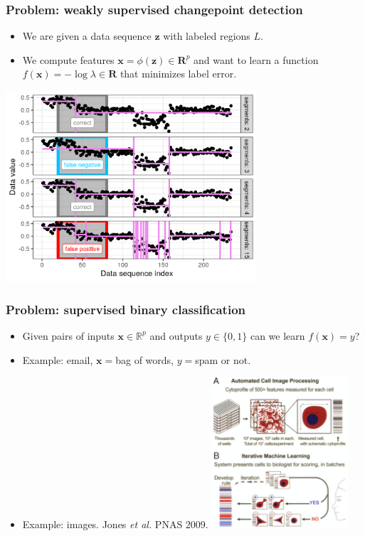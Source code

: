 \documentclass{beamer}
\begin{document}
\begin{frame}
  \frametitle{Problem: weakly supervised changepoint detection}
  \begin{itemize}
  \item We are given a data sequence $\mathbf z$ with labeled regions
    $L$.
  \item We compute features $\mathbf x=\phi(\mathbf z)\in\mathbf R^p$
    and want to learn a function $f(\mathbf x)=-\log\lambda\in\mathbf R$ that minimizes label
    error.
  \end{itemize}

  \includegraphics[width=0.7\textwidth]{figure-fn-not-monotonic}

\end{frame}

\begin{frame}
  \frametitle{Problem: supervised binary classification}
  
  \begin{itemize}
  \item Given pairs of inputs $\mathbf x\in\mathbb R^p$ and outputs
    $y\in\{0,1\}$ can we learn $f(\mathbf x)= y$?
  \item Example: email, $\mathbf x =$bag of words, $y=$spam or not.
  \item Example: images. Jones {\it et al.} PNAS 2009. \includegraphics[width=2in]{cellprofiler} 
  \end{itemize} 

\end{frame}
\end{document}

